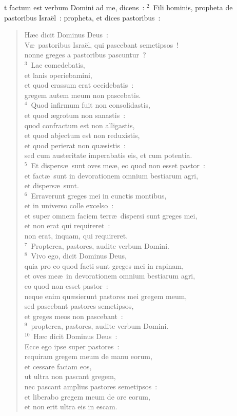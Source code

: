 \bchapter
{}t factum est verbum Domini ad me, dicens~:
${}^{2}$~Fili hominis, propheta de pastoribus Isra\"el~: propheta, et dices pastoribus~: \begin{verse}H\ae c dicit Dominus Deus~:\\ V\ae\ pastoribus Isra\"el, qui pascebant semetipsos~!\\ nonne greges a pastoribus pascuntur~?\\
${}^{3}$~Lac comedebatis,\\ et lanis operiebamini,\\ et quod crassum erat occidebatis~:\\ gregem autem meum non pascebatis.\\
${}^{4}$~Quod infirmum fuit non consolidastis,\\ et quod \ae grotum non sanastis~:\\ quod confractum est non alligastis,\\ et quod abjectum est non reduxistis,\\ et quod perierat non qu\ae sistis~:\\ sed cum austeritate imperabatis eis, et cum potentia.\\
${}^{5}$~Et dispers\ae\ sunt oves me\ae , eo quod non esset pastor~:\\ et fact\ae\ sunt in devorationem omnium bestiarum agri,\\ et dispers\ae\ sunt.\\
${}^{6}$~Erraverunt greges mei in cunctis montibus,\\ et in universo colle excelso~:\\ et super omnem faciem terr\ae\ dispersi sunt greges mei,\\ et non erat qui requireret~:\\ non erat, inquam, qui requireret.\\
${}^{7}$~Propterea, pastores, audite verbum Domini.\\
${}^{8}$~Vivo ego, dicit Dominus Deus,\\ quia pro eo quod facti sunt greges mei in rapinam,\\ et oves me\ae\ in devorationem omnium bestiarum agri,\\ eo quod non esset pastor~:\\ neque enim qu\ae sierunt pastores mei gregem meum,\\ sed pascebant pastores semetipsos,\\ et greges meos non pascebant~:\\
${}^{9}$~propterea, pastores, audite verbum Domini.\\
${}^{10}$~H\ae c dicit Dominus Deus~:\\ Ecce ego ipse super pastores~:\\ requiram gregem meum de manu eorum,\\ et cessare faciam eos,\\ ut ultra non pascant gregem,\\ nec pascant amplius pastores semetipsos~:\\ et liberabo gregem meum de ore eorum,\\ et non erit ultra eis in escam.\end{verse}


